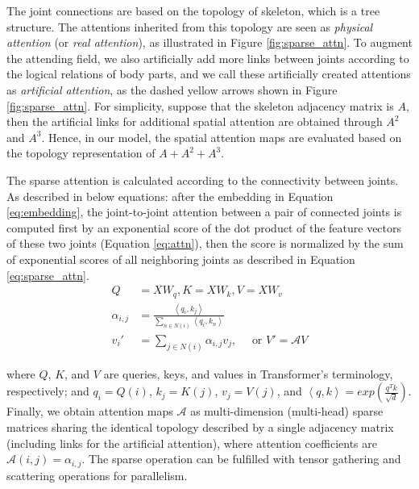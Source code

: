 \documentclass[letterpaper]{article} %
\begin{document}
The joint connections are based on the topology of skeleton, which is a tree structure. The attentions inherited from this topology are seen as \textit{physical attention} (or \textit{real attention}), as illustrated in Figure \ref{fig:sparse_attn}. To augment the attending field, we also artificially add more links between joints according to the logical relations of body parts, and we call these artificially created attentions as \textit{artificial attention}, as the dashed yellow arrows shown in Figure \ref{fig:sparse_attn}. For simplicity, suppose that the skeleton adjacency matrix is $A$, then the artificial links for additional spatial attention are obtained through $A^2$ and $A^3$. Hence, in our model, the spatial attention maps are evaluated based on the topology representation of $A + A^2 + A^3$.

The sparse attention is calculated according to the connectivity between joints. As described in below equations: after the embedding in Equation \ref{eq:embedding}, the joint-to-joint attention between a pair of connected joints is computed first by an exponential score of the dot product of the feature vectors of these two joints (Equation \ref{eq:attn}), then the score is normalized by the sum of exponential scores of all neighboring joints as described in Equation \ref{eq:sparse_attn}.
\begin{align}
    Q &= X W_q, K = X W_k, V = X W_v \label{eq:embedding}\\
    \alpha_{i, j} &= \frac{\left<q_i, k_j\right>}{\sum_{n \in N(i)} \left< q_i, k_n \right>}
   \label{eq:attn} \\
    v_{i}' &= \sum_{j \in N(i)} \alpha_{i, j} v_j, \quad\text{ or }  V' = \mathcal{A} V
    \label{eq:sparse_attn}
\end{align}

where $Q$, $K$, and $V$ are queries, keys, and values in Transformer's terminology, respectively; and $q_i = Q(i)$, $k_j = K(j)$, $v_j = V(j)$, and $\left< q, k \right> = exp\left( \frac{q^T k}{\sqrt{d}} \right)$. Finally, we obtain attention maps $\mathcal{A}$ as multi-dimension (multi-head) sparse matrices sharing the identical topology described by a single adjacency matrix (including links for the artificial attention), where attention coefficients are $\mathcal{A}(i, j) = \alpha_{i, j}$. The sparse operation can be fulfilled with tensor gathering and scattering operations for parallelism.
\end{document}
